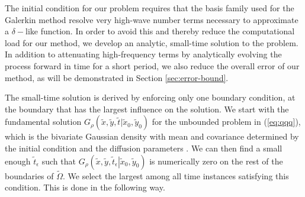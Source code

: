 The initial condition for our problem requires that the basis family
used for the Galerkin method resolve very high-wave number terms
necessary to approximate a $\delta-$like function. In order to avoid this
and thereby reduce the computational load for our method, we develop
an analytic, small-time solution to the problem. In addition to
attenuating high-frequency terms by analytically evolving the process
forward in time for a short period, we also reduce the overall error
of our method, as will be demonstrated in Section
\ref{sec:error-bound}.

The small-time solution is derived by enforcing only one boundary
condition, at the boundary that has the largest influence on the
solution. We start with the fundamental solution
$G_\rho(\tilde{x},\tilde{y},\tilde{t} | \tilde{x}_0, \tilde{y}_0)$ for
the unbounded problem in (\ref{eq:qqq}), which is the bivariate
Gaussian density with mean and covariance determined by the initial
condition and the diffusion parameters \citep{stakgold2011green}. We
can then find a small enough $\tilde{t}_\epsilon$ such that
$G_\rho\left(\tilde{x},\tilde{y}, \tilde{t}_\epsilon \left|
    \tilde{x}_0, \tilde{y}_0 \right.\right)$ is numerically zero on
the rest of the boundaries of $\tilde{\Omega}$. We select the largest
among all time instances satisfying this condition. This is done in
the following way.
